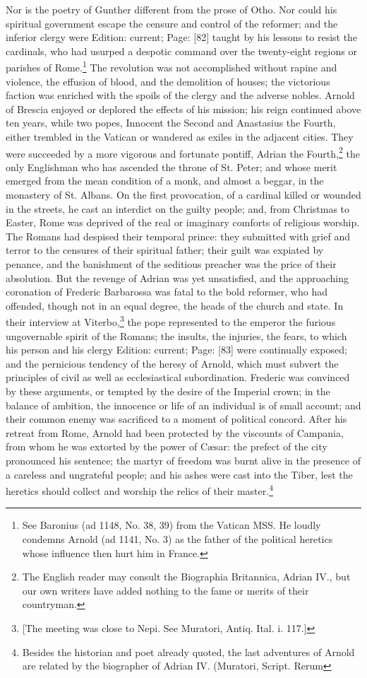 {Nor is the poetry of Gunther different from the prose of Otho.} Nor could his spiritual government escape the censure and control of the reformer; and the inferior clergy were Edition: current; Page: [82] taught by his lessons to resist the cardinals, who had usurped a despotic command over the twenty-eight regions or parishes of Rome.\footnote{See Baronius (ad 1148, No. 38, 39) from the Vatican MSS. He loudly condemns Arnold (ad 1141, No. 3) as the father of the political heretics whose influence then hurt him in France.} The revolution was not accomplished without rapine and violence, the effusion of blood, and the demolition of houses; the victorious faction was enriched with the spoils of the clergy and the adverse nobles. Arnold of Brescia enjoyed or deplored the effects of his mission; his reign continued above ten years, while two popes, Innocent the Second and Anastasius the Fourth, either trembled in the Vatican or wandered as exiles in the adjacent cities. They were succeeded by a more vigorous and fortunate pontiff, Adrian the Fourth,\footnote{The English reader may consult the Biographia Britannica, Adrian IV., but our own writers have added nothing to the fame or merits of their countryman.} the only Englishman who has ascended the throne of St. Peter; and whose merit emerged from the mean condition of a monk, and almost a beggar, in the monastery of St. Albans. On the first provocation, of a cardinal killed or wounded in the streets, he cast an interdict on the guilty people; and, from Christmas to Easter, Rome was deprived of the real or imaginary comforts of religious worship. The Romans had despised their temporal prince: they submitted with grief and terror to the censures of their spiritual father; their guilt was expiated by penance, and the banishment of the seditious preacher was the price of their absolution. But the revenge of Adrian was yet unsatisfied, and the approaching coronation of Frederic Barbarossa was fatal to the bold reformer, who had offended, though not in an equal degree, the heads of the church and state. In their interview at Viterbo,\footnote{[The meeting was close to Nepi. See Muratori, Antiq. Ital. i. 117.]} the pope represented to the emperor the furious ungovernable spirit of the Romans; the insults, the injuries, the fears, to which his person and his clergy Edition: current; Page: [83] were continually exposed; and the pernicious tendency of the heresy of Arnold, which must subvert the principles of civil as well as ecclesiastical subordination. Frederic was convinced by these arguments, or tempted by the desire of the Imperial crown; in the balance of ambition, the innocence or life of an individual is of small account; and their common enemy was sacrificed to a moment of political concord. After his retreat from Rome, Arnold had been protected by the viscounts of Campania, from whom he was extorted by the power of Cæsar: the prefect of the city pronounced his sentence; the martyr of freedom was burnt alive in the presence of a careless and ungrateful people; and his ashes were cast into the Tiber, lest the heretics should collect and worship the relics of their master.\footnote{Besides the historian and poet already quoted, the last adventures of Arnold are related by the biographer of Adrian IV. (Muratori, Script. Rerum }
